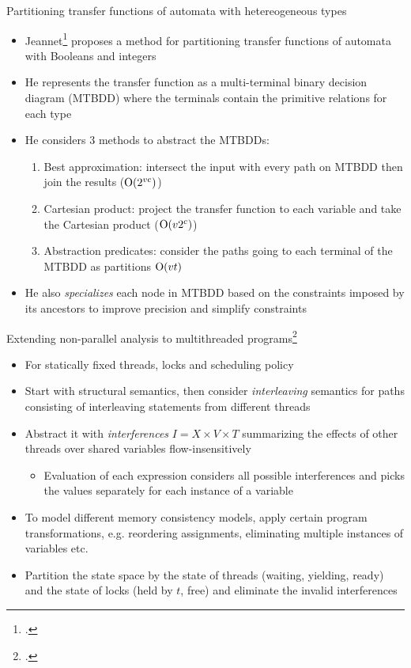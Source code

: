 \documentclass[aspectratio=169]{beamer}
\begin{document}
\begin{frame}{Partitioning transfer functions of automata with hetereogeneous types}
  \small
  \begin{itemize}
  \item Jeannet\footcite{jeannet_representing_2002} proposes a method for partitioning transfer functions of automata with Booleans and integers
  \item He represents the transfer function as a multi-terminal binary decision diagram (MTBDD) where the terminals contain the primitive relations for each type
  \item He considers 3 methods to abstract the MTBDDs:
    \begin{enumerate}
    \item Best approximation: intersect the input with every path on MTBDD then join the results ($\operatorname{O}(2^{vc})$)
    \item Cartesian product: project the transfer function to each variable and take the Cartesian product ($\operatorname{O}(v2^{c})$)
    \item Abstraction predicates: consider the paths going to each terminal of the MTBDD as partitions $\operatorname{O}(vt)$
    \end{enumerate}
  \item He also \emph{specializes} each node in MTBDD based on the constraints imposed by its ancestors to improve precision and simplify constraints
  \end{itemize}
\end{frame}

\begin{frame}{Extending non-parallel analysis to multithreaded programs\footcite{mine2011static}}
  \footnotesize
  \begin{itemize}[<+->]
  \item For statically fixed threads, locks and scheduling policy
  \item Start with structural semantics, then consider \emph{interleaving} semantics for paths consisting of interleaving statements from different threads
  \item Abstract it with \emph{interferences} $I = X \times V \times T$ summarizing the effects of other threads over shared variables flow-insensitively
    \begin{itemize}[<+->]\footnotesize
    \item Evaluation of each expression considers all possible interferences and picks the values separately for each instance of a variable
    \end{itemize}
  \item To model different memory consistency models, apply certain program transformations, e.g. reordering assignments, eliminating multiple instances of variables etc.
  \item Partition the state space by the state of threads (waiting, yielding, ready) and the state of locks (held by $t$, free) and eliminate the invalid interferences
  \end{itemize}
\end{frame}
\end{document}
